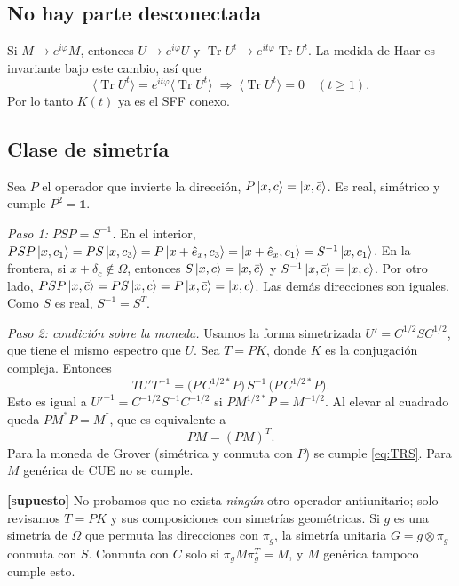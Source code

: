 \documentclass[aps, pra, onecolumn, longbibliography]{revtex4-2}
\newcommand{\Tr}{\operatorname{Tr}}
\begin{document}
\subsection{No hay parte desconectada}
Si $M\to e^{i\varphi}M$, entonces $U\to e^{i\varphi}U$ y
$\Tr U^t\to e^{it\varphi}\Tr U^t$. La medida de Haar es invariante bajo este
cambio, así que
\begin{equation}
    \langle\Tr U^t\rangle=e^{it\varphi}\langle\Tr U^t\rangle
    \;\Rightarrow\;
    \langle\Tr U^t\rangle=0\quad(t\ge1).
\end{equation}
Por lo tanto $K(t)$ ya es el SFF conexo.

\subsection{Clase de simetría}
Sea $P$ el operador que invierte la dirección, $P\ket{x,c}=\ket{x,\bar c}$.
Es real, simétrico y cumple $P^2=\mathbb 1$.

\emph{Paso 1: $PSP=S^{-1}$.} En el interior,
$PSP\ket{x,c_1}=PS\ket{x,c_3}=P\ket{x+\hat e_x,c_3}=\ket{x+\hat e_x,c_1}
=S^{-1}\ket{x,c_1}$. En la frontera, si $x+\delta_c\notin\Omega$, entonces
$S\ket{x,c}=\ket{x,\bar c}$ y $S^{-1}\ket{x,\bar c}=\ket{x,c}$. Por otro lado,
$PSP\ket{x,\bar c}=PS\ket{x,c}=P\ket{x,\bar c}=\ket{x,c}$. Las demás
direcciones son iguales. Como $S$ es real, $S^{-1}=S^T$.

\emph{Paso 2: condición sobre la moneda.} Usamos la forma simetrizada
$U'=C^{1/2}SC^{1/2}$, que tiene el mismo espectro que $U$. Sea $T=PK$, donde
$K$ es la conjugación compleja. Entonces
\begin{equation}
    TU'T^{-1}=\bigl(P\,C^{1/2*}P\bigr)\,S^{-1}\,\bigl(P\,C^{1/2*}P\bigr).
\end{equation}
Esto es igual a $U'^{-1}=C^{-1/2}S^{-1}C^{-1/2}$ si $P M^{1/2*}P=M^{-1/2}$.
Al elevar al cuadrado queda $PM^*P=M^\dagger$, que es equivalente a
\begin{equation}
    PM=(PM)^T .
    \label{eq:TRS}
\end{equation}
Para la moneda de Grover (simétrica y conmuta con $P$) se cumple
\eqref{eq:TRS}. Para $M$ genérica de CUE no se cumple.

\textbf{[supuesto]} No probamos que no exista \emph{ningún} otro operador
antiunitario; solo revisamos $T=PK$ y sus composiciones con simetrías
geométricas. Si $g$ es una simetría de $\Omega$ que permuta las direcciones
con $\pi_g$, la simetría unitaria $G=g\otimes\pi_g$ conmuta con $S$. Conmuta
con $C$ solo si $\pi_g M\pi_g^T=M$, y $M$ genérica tampoco cumple esto.
\end{document}
